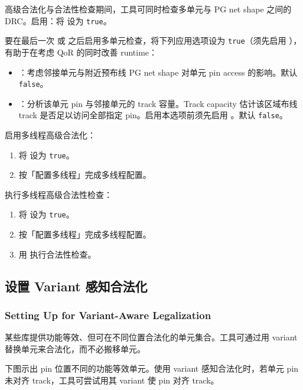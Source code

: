 高级合法化与合法性检查期间，工具可同时检查多单元与 PG net shape 之间的 DRC。启用：将  设为 \texttt{true}。

要在最后一次  或  之后启用多单元检查，将下列应用选项设为 \texttt{true}（须先启用 ），有助于在考虑 QoR 的同时改善 runtime：
\begin{itemize}
  \item {}：考虑邻接单元与附近预布线 PG net shape 对单元 pin access 的影响。默认 \texttt{false}。
  \item {}：分析该单元 pin 与邻接单元的 track 容量。Track capacity 估计该区域布线 track 是否足以访问全部指定 pin。启用本选项前须先启用 。默认 \texttt{false}。
\end{itemize}

启用多线程高级合法化：
\begin{enumerate}
  \item 将  设为 \texttt{true}。
  \item 按「配置多线程」完成多线程配置。
\end{enumerate}

执行多线程高级合法性检查：
\begin{enumerate}
  \item 将  设为 \texttt{true}。
  \item 按「配置多线程」完成多线程配置。
  \item 用  执行合法性检查。
\end{enumerate}

\subsection{设置 Variant 感知合法化}
\subsubsection*{Setting Up for Variant-Aware Legalization}

某些库提供功能等效、但可在不同位置合法化的单元集合。工具可通过用 variant 替换单元来合法化，而不必搬移单元。

下图示出 pin 位置不同的功能等效单元。使用 variant 感知合法化时，若单元 pin 未对齐 track，工具可尝试用其 variant 使 pin 对齐 track。

